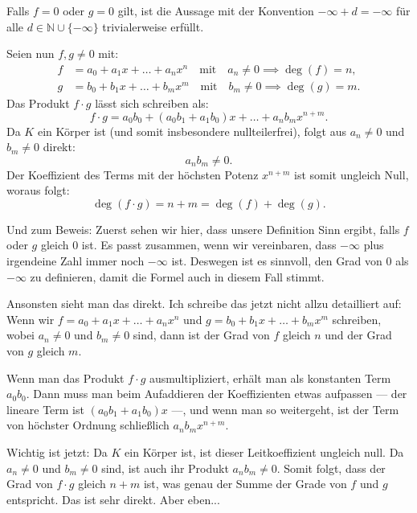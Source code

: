 \begin{math-stroke}

\begin{short-proof}
Falls $f = 0$ oder $g = 0$ gilt, ist die Aussage mit der Konvention $-\infty + d = -\infty$ für alle $d \in \mathbb{N} \cup \{-\infty\}$ trivialerweise erfüllt.

Seien nun $f, g \neq 0$ mit:
\begin{align*}
f &= a_0 + a_1 x + \dots + a_n x^n \quad \text{mit} \quad a_n \neq 0 \implies \deg(f) = n, \\
g &= b_0 + b_1 x + \dots + b_m x^m \quad \text{mit} \quad b_m \neq 0 \implies \deg(g) = m.
\end{align*}
Das Produkt $f \cdot g$ lässt sich schreiben als:
\[
f \cdot g = a_0 b_0 + (a_0 b_1 + a_1 b_0) x + \dots + a_n b_m x^{n+m}.
\]
Da $K$ ein Körper ist (und somit insbesondere nullteilerfrei), folgt aus $a_n \neq 0$ und $b_m \neq 0$ direkt:
\[
a_n b_m \neq 0.
\]
Der Koeffizient des Terms mit der höchsten Potenz $x^{n+m}$ ist somit ungleich Null, woraus folgt:
\[
\deg(f \cdot g) = n + m = \deg(f) + \deg(g).
\]
\end{short-proof}
\end{math-stroke}

\begin{spoken-clean}[00:13:35 - 00:15:00]
Und zum Beweis: Zuerst sehen wir hier, dass unsere Definition Sinn ergibt, falls $f$ oder $g$ gleich $0$ ist. Es passt zusammen, wenn wir vereinbaren, dass $-\infty$ plus irgendeine Zahl immer noch $-\infty$ ist. Deswegen ist es sinnvoll, den Grad von $0$ als $-\infty$ zu definieren, damit die Formel auch in diesem Fall stimmt. 

Ansonsten sieht man das direkt. Ich schreibe das jetzt nicht allzu detailliert auf: Wenn wir $f = a_0 + a_1 x + \dots + a_n x^n$ und $g = b_0 + b_1 x + \dots + b_m x^m$ schreiben, wobei $a_n \neq 0$ und $b_m \neq 0$ sind, dann ist der Grad von $f$ gleich $n$ und der Grad von $g$ gleich $m$. 

Wenn man das Produkt $f \cdot g$ ausmultipliziert, erhält man als konstanten Term $a_0 b_0$. Dann muss man beim Aufaddieren der Koeffizienten etwas aufpassen --- der lineare Term ist $(a_0 b_1 + a_1 b_0)x$ ---, und wenn man so weitergeht, ist der Term von höchster Ordnung schließlich $a_n b_m x^{n+m}$. 

Wichtig ist jetzt: Da $K$ ein Körper ist, ist dieser Leitkoeffizient ungleich null. Da $a_n \neq 0$ und $b_m \neq 0$ sind, ist auch ihr Produkt $a_n b_m \neq 0$. Somit folgt, dass der Grad von $f \cdot g$ gleich $n + m$ ist, was genau der Summe der Grade von $f$ und $g$ entspricht. Das ist sehr direkt. Aber eben...
\end{spoken-clean}

